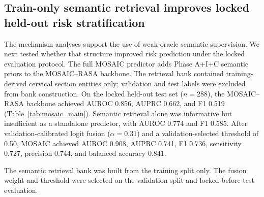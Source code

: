 \FloatBarrier

\subsection{Train-only semantic retrieval improves locked held-out risk stratification}
\label{subsec:mosaic_main_results}

The mechanism analyses support the use of weak-oracle semantic supervision. We next tested whether that structure improved risk prediction under the locked evaluation protocol. The full MOSAIC predictor adds Phase A+I+C semantic priors to the MOSAIC--RASA backbone. The retrieval bank contained training-derived cervical section entities only; validation and test labels were excluded from bank construction. On the locked held-out test set (\(n=288\)), the MOSAIC--RASA backbone achieved AUROC 0.856, AUPRC 0.662, and F1 0.519 (Table~\ref{tab:mosaic_main}). Semantic retrieval alone was informative but insufficient as a standalone predictor, with AUROC 0.774 and F1 0.585. After validation-calibrated logit fusion (\(\alpha=0.31\)) and a validation-selected threshold of 0.50, MOSAIC achieved AUROC 0.908, AUPRC 0.741, F1 0.736, sensitivity 0.727, precision 0.744, and balanced accuracy 0.841.

\begin{table}[!htbp]
  \centering
  \caption{Locked held-out test performance of the MOSAIC semantic-prior pipeline.}
  \label{tab:mosaic_main}
  \scriptsize
  \begin{threeparttable}
  \begin{tablenotes}[flushleft]
    \footnotesize
    \item The semantic retrieval bank was built from the training split only. The fusion weight and threshold were selected on the validation split and locked before test evaluation.
  \end{tablenotes}
  \end{threeparttable}
\end{table}

